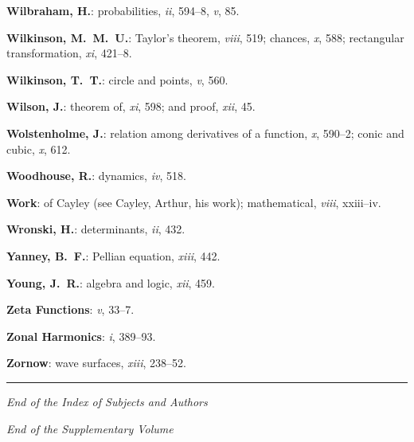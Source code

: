 \documentclass[11pt,a4paper]{article}
\newcommand{\IndexEntry}[1]{\textbf{#1}}
\newcommand{\V}[1]{\textit{#1}} %
\begin{document}
\newpage

\setcounter{page}{132}

\IndexEntry{Wilbraham, H.}: probabilities, \V{ii}, 594--8, \V{v}, 85.

\IndexEntry{Wilkinson, M.\ M.\ U.}: Taylor's theorem, \V{viii}, 519; chances, \V{x}, 588; rectangular transformation, \V{xi}, 421--8.

\IndexEntry{Wilkinson, T.\ T.}: circle and points, \V{v}, 560.

\IndexEntry{Wilson, J.}: theorem of, \V{xi}, 598; and proof, \V{xii}, 45.

\IndexEntry{Wolstenholme, J.}: relation among derivatives of a function, \V{x}, 590--2; conic and cubic, \V{x}, 612.

\IndexEntry{Woodhouse, R.}: dynamics, \V{iv}, 518.

\IndexEntry{Work}: of Cayley (see Cayley, Arthur, his work); mathematical, \V{viii}, xxiii--iv.

\IndexEntry{Wronski, H.}: determinants, \V{ii}, 432.

\IndexEntry{Yanney, B.\ F.}: Pellian equation, \V{xiii}, 442.

\IndexEntry{Young, J.\ R.}: algebra and logic, \V{xii}, 459.

\IndexEntry{Zeta Functions}: \V{v}, 33--7.

\IndexEntry{Zonal Harmonics}: \V{i}, 389--93.

\IndexEntry{Zornow}: wave surfaces, \V{xiii}, 238--52.

\vfill


\onecolumn
\normalsize

\begin{center}
\rule{0.5\textwidth}{0.4pt}

\vspace{1em}
\textit{End of the Index of Subjects and Authors}

\vspace{0.5em}
\textit{End of the Supplementary Volume}
\end{center}

\vfill

\clearpage
\thispagestyle{empty}
\null\newpage  %
\thispagestyle{empty}
\null\newpage  %
\thispagestyle{empty}
\null\newpage  %
\thispagestyle{empty}
\null\newpage  %
\thispagestyle{empty}
\null\newpage  %
\end{document}
